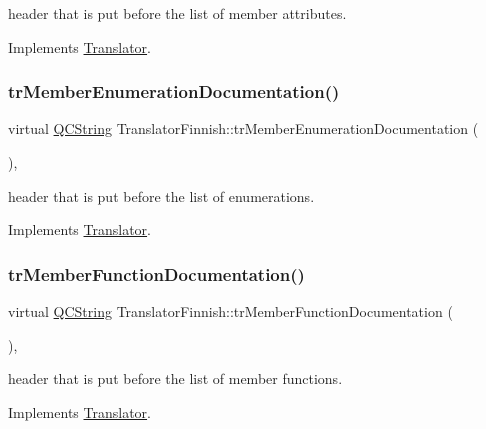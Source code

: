 header that is put before the list of member attributes. 

Implements \mbox{\hyperlink{class_translator}{Translator}}.

\mbox{\label{class_translator_finnish_ae0e9cc453372b946a6ec252916102474}} 
\subsubsection{\texorpdfstring{trMemberEnumerationDocumentation()}{trMemberEnumerationDocumentation()}}
{\footnotesize\ttfamily virtual \mbox{\hyperlink{class_q_c_string}{Q\+C\+String}} Translator\+Finnish\+::tr\+Member\+Enumeration\+Documentation (\begin{DoxyParamCaption}{ }\end{DoxyParamCaption})\hspace{0.3cm}{\ttfamily [inline]}, {\ttfamily [virtual]}}

header that is put before the list of enumerations. 

Implements \mbox{\hyperlink{class_translator}{Translator}}.

\mbox{\label{class_translator_finnish_a06c72edc07156d0d174fa189a148adfe}} 
\subsubsection{\texorpdfstring{trMemberFunctionDocumentation()}{trMemberFunctionDocumentation()}}
{\footnotesize\ttfamily virtual \mbox{\hyperlink{class_q_c_string}{Q\+C\+String}} Translator\+Finnish\+::tr\+Member\+Function\+Documentation (\begin{DoxyParamCaption}{ }\end{DoxyParamCaption})\hspace{0.3cm}{\ttfamily [inline]}, {\ttfamily [virtual]}}

header that is put before the list of member functions. 

Implements \mbox{\hyperlink{class_translator}{Translator}}.

